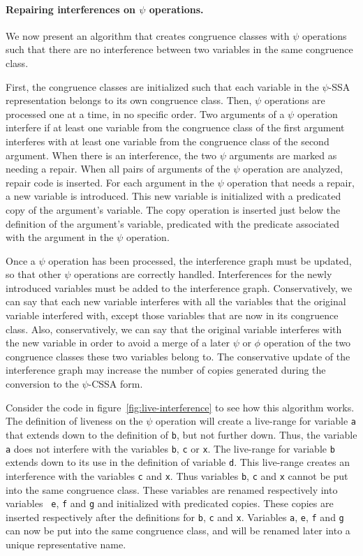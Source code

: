 \paragraph{Repairing interferences on $\psi$ operations.}
We now present an algorithm that creates congruence classes with
$\psi$ operations such that there are no interference between two
variables in the same congruence class.

First, the congruence classes are initialized such that each variable
in the $\psi$-SSA representation belongs to its own congruence
class. Then, $\psi$ operations are processed one at a time, in no
specific order. Two arguments of a $\psi$ operation interfere if at
least one variable from the congruence class of the first argument
interferes with at least one variable from the congruence class of the
second argument. When there is an interference, the two $\psi$
arguments are marked as needing a repair. When all pairs of arguments
of the $\psi$ operation are analyzed, repair code is inserted. For
each argument in the $\psi$ operation that needs a repair, a new
variable is introduced. This new variable is initialized with a
predicated copy of the argument's variable. The copy operation is
inserted just below the definition of the argument's variable,
predicated with the predicate associated with the argument in the
$\psi$ operation.

Once a $\psi$ operation has been processed, the interference graph
must be updated, so that other $\psi$ operations are correctly
handled. Interferences for the newly introduced variables must be
added to the interference graph. Conservatively, we can say that each
new variable interferes with all the variables that the
original variable interfered with, except those variables that
are now in its congruence class. Also, conservatively, we can say
that the original variable interferes with the new variable in order
to avoid a merge of a later $\psi$ or $\phi$ operation of the two
congruence classes these two variables belong to. The conservative
update of the interference graph may increase the number of copies
generated during the conversion to the $\psi$-CSSA form.

Consider the code in figure~\ref{fig:live-interference} to see how this
algorithm works. The definition of liveness on the $\psi$ operation
will create a live-range for variable {\tt a} that extends down to the
definition of {\tt b}, but not further down. Thus, the variable {\tt a}
does not interfere with the variables {\tt b}, {\tt c} or {\tt x}. The
live-range for variable {\tt b} extends down to its use in the
definition of variable {\tt d}. This live-range creates an
interference with the variables {\tt c} and {\tt x}. Thus variables
{\tt b}, {\tt c} and {\tt x} cannot be put into the same congruence
class. These variables are renamed respectively into variables {\tt
e}, {\tt f} and {\tt g} and initialized with predicated copies. These
copies are inserted respectively after the definitions for {\tt b},
{\tt c} and {\tt x}. Variables {\tt a}, {\tt e}, {\tt f} and {\tt g}
can now be put into the same congruence class, and will be renamed
later into a unique representative name.

